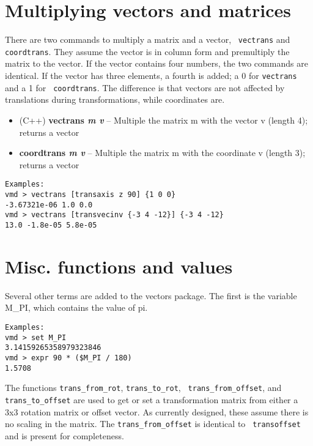 
\section{Multiplying vectors and matrices}

There are two commands to multiply a matrix and a vector, {\tt
vectrans} and {\tt coordtrans}.  They assume the vector is in column
form and premultiply the matrix to the vector.  If the vector contains
four numbers, the two commands are identical.  If the vector has three
elements, a fourth is added; a 0 for {\tt vectrans} and a 1 for {\tt
coordtrans}.  The difference is that vectors are not affected by
translations during transformations, while coordinates are.
\begin{itemize}
\item (C++) {\bf vectrans {\it m v}} --
Multiple the matrix m with the vector v (length 4); returns a vector
\item {\bf coordtrans {\it m v}} --
Multiple the matrix m with the coordinate v (length 3); returns a vector
\end{itemize}
\begin{verbatim}
Examples:
vmd > vectrans [transaxis z 90] {1 0 0}
-3.67321e-06 1.0 0.0
vmd > vectrans [transvecinv {-3 4 -12}] {-3 4 -12}
13.0 -1.8e-05 5.8e-05
\end{verbatim}


\section{Misc. functions and values}

  Several other terms are added to the vectors package.  The first is
the variable M\_PI, which contains the value of pi.
\begin{verbatim}
Examples:
vmd > set M_PI
3.14159265358979323846
vmd > expr 90 * ($M_PI / 180)
1.5708
\end{verbatim}

  The functions {\tt trans\_from\_rot}, {\tt trans\_to\_rot}, {\tt
trans\_from\_offset}, and {\tt trans\_to\_offset} are used to get or set a
transformation matrix from either a 3x3 rotation matrix or offset
vector.  As currently designed, these assume there is no scaling in
the matrix.  The {\tt trans\_from\_offset} is identical to {\tt
transoffset} and is present for completeness.



